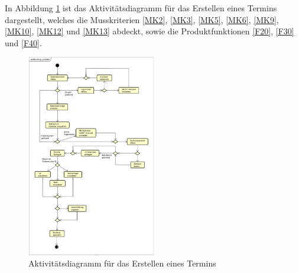 In Abbildung \ref{fig:activity_diagram_booking} ist das Aktivitätsdiagramm für das Erstellen eines Termins dargestellt,
welches die Musskriterien \ref{MK2}, \ref{MK3}, \ref{MK5}, \ref{MK6}, \ref{MK9}, \ref{MK10}, \ref{MK12} und \ref{MK13} abdeckt,
sowie die Produktfunktionen \ref{F20}, \ref{F30} und \ref{F40}.
\begin{figure}[ht]
    \centering
    \includegraphics[width=0.5\textwidth]{figures/activitydiagrams/buchungerstellen}
    \caption{Aktivitätsdiagramm für das Erstellen eines Termins}
    \label{fig:activity_diagram_booking}
\end{figure}


\clearpage
